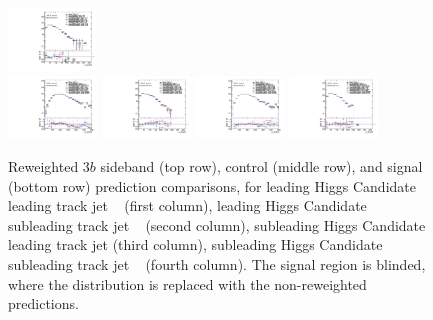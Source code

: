 \begin{figure}[htbp!]
\begin{center}
\includegraphics[width=0.21\textwidth,angle=-90]{figures/boosted/AppendixReweight/Compare/Data_ThreeTag_Control_directcompare_sublHCand_trk1_Pt_1.pdf}\\
\includegraphics[width=0.21\textwidth,angle=-90]{figures/boosted/AppendixReweight/Compare/Data_ThreeTag_Signal_directcompare_leadHCand_trk0_Pt_1.pdf}
\includegraphics[width=0.21\textwidth,angle=-90]{figures/boosted/AppendixReweight/Compare/Data_ThreeTag_Signal_directcompare_leadHCand_trk1_Pt_1.pdf}
\includegraphics[width=0.21\textwidth,angle=-90]{figures/boosted/AppendixReweight/Compare/Data_ThreeTag_Signal_directcompare_sublHCand_trk0_Pt_1.pdf}
\includegraphics[width=0.21\textwidth,angle=-90]{figures/boosted/AppendixReweight/Compare/Data_ThreeTag_Signal_directcompare_sublHCand_trk1_Pt_1.pdf}\\
\caption{Reweighted $3b$ sideband (top row), control (middle row), and signal (bottom row) prediction comparisons, for leading Higgs Candidate leading track jet \pt~ (first column),  leading Higgs Candidate subleading track jet \pt~ (second column), subleading Higgs Candidate leading track jet \pt (third column), subleading Higgs Candidate subleading track jet \pt~ (fourth column). The signal region is blinded, where the distribution is replaced with the non-reweighted predictions.}
\label{fig:app-rw-comp-3b-trkjet}
\end{center}
\end{figure}

